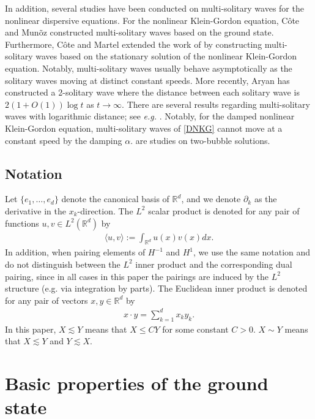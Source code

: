 \documentclass[reqno]{amsart}
\theoremstyle{plain}
\theoremstyle{definition}
\numberwithin{equation}{section}
\newcommand{\1}{\mathbbm{1}}
\begin{document}
 In addition, several studies have been conducted on multi-solitary waves for the nonlinear dispersive equations. For the nonlinear Klein-Gordon equation, C\^{o}te and Mun\~{o}z \cite{CM} constructed multi-solitary waves based on the ground state. Furthermore, C\^{o}te and Martel \cite{CM1} extended the work of \cite{CM} by constructing multi-solitary waves based on the stationary solution of the nonlinear Klein-Gordon equation. Notably, multi-solitary waves usually behave asymptotically as the solitary waves moving at distinct constant speeds. More recently, Aryan \cite{A} has constructed a 2-solitary wave where the distance between each solitary wave is $2(1+O(1))\log{t}$ as $t\to \infty$. There are several results regarding multi-solitary waves with logarithmic distance; see \textit{e.g.} \cite{GI,MN,N1,N2}. Notably, for the damped nonlinear Klein-Gordon equation, multi-solitary waves of \eqref{DNKG} cannot move at a constant speed by the damping $\alpha$. \cite{J1,J2,JL1,JL2,JL4,JL3} are studies on two-bubble solutions. 


\subsection{Notation}
Let $\{e_1,\ldots, e_d\}$ denote the canonical basis of $\mathbb{R}^d$, and we denote ${\partial}_k$ as the derivative in the $x_k$-direction. The $L^2$ scalar product is denoted for any pair of functions $u,v\in L^2(\mathbb{R}^d)$ by
\begin{align}\label{L2product}
\langle u,v\rangle:=\int_{\mathbb{R}^d}u(x)v(x)dx.
\end{align}
In addition, when pairing elements of $H^{-1}$ and $H^1$, we use the same notation and do not distinguish between the $L^2$ inner product and the corresponding dual pairing, since in all cases in this paper the pairings are induced by the $L^2$ structure (e.g. via integration by parts). The Euclidean inner product is denoted for any pair of vectors $x,y\in \mathbb{R}^d$ by
\begin{align}\label{Euclideanproduct}
x\cdot y=\sum_{k=1}^dx_ky_k.
\end{align}
 In this paper, $X\lesssim Y$ means that $X\leq CY$ for some constant $C>0$. $X\sim Y$ means that $X\lesssim Y$ and $Y\lesssim X$.




\section{Basic properties of the ground state}
\end{document}
